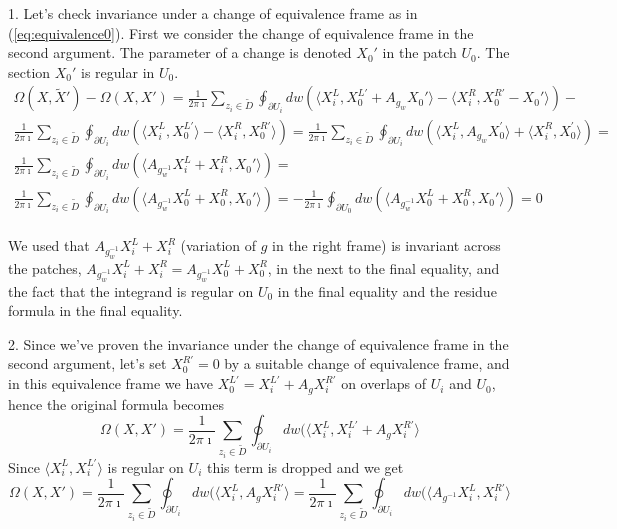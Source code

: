 \documentclass[11pt, oneside, reqno]{amsart}
\theoremstyle{definition} \newtheorem{definition}{Definition}[section]
\theoremstyle{definition} \newtheorem{remark}[definition]{Remark}
\theoremstyle{definition} \newtheorem{remarks}[definition]{Remarks}
\theoremstyle{definition} \newtheorem{question}[definition]{Question}
\theoremstyle{definition} \newtheorem*{note}{Note}
\theoremstyle{definition} \newtheorem{example}[definition]{Example}
\theoremstyle{definition} \newtheorem{examples}[definition]{Examples}
\begin{document}
1. Let's check invariance under a change of equivalence frame 
as in (\ref{eq:equivalence0}). First we consider the change
of equivalence frame in the second argument. 
The parameter of a change is denoted $X_0'$ in the patch $U_0$. The section $X_{0}'$ is regular in $U_{0}$. 
\begin{multline}
   \Omega(X, \tilde X') - \Omega( X,X')  = \frac{1}{2 \pi \imath} \sum_{z_i \in \tilde D} \oint_{\partial U_i}  dw (
   \langle  X^{L}_{i} ,  X^{L'}_{0} + A_{g_{w}} X_{0}' \rangle  - \langle X^{R}_{i} ,  X^{R'}_{0} - X_{0}'\rangle ) - \\
   \frac{1}{2 \pi \imath} \sum_{z_i \in \tilde D} \oint_{\partial U_i}  dw (
   \langle  X^{L}_{i} ,  X^{L'}_{0} \rangle  - \langle X^{R}_{i} ,  X^{R'}_{0} \rangle )   =
\frac{1}{2 \pi \imath} \sum_{z_i \in \tilde D} \oint_{\partial U_i}  dw (
\langle   X_{i}^{L},   A_{g_{w}}X^{'}_{0} \rangle  + \langle  X_{i}^{R},  X^{'}_{0} \rangle ) = \\
\frac{1}{2 \pi \imath} \sum_{z_i \in \tilde D} \oint_{\partial U_i}  dw (
\langle   A_{g_{w}^{-1}}  X_{i}^{L} + X_{i}^{R}, X_{0}' \rangle )  =\\
\frac{1}{2 \pi \imath} \sum_{z_i \in \tilde D} \oint_{\partial U_i}  dw (
\langle   A_{g_{w}^{-1}}  X_{0}^{L} + X_{0}^{R}, X_{0}' \rangle )  =
- \frac{1}{2 \pi \imath} \oint_{\partial U_0} dw (
\langle   A_{g_{w}^{-1}}  X_{0}^{L} + X_{0}^{R}, X_{0}' \rangle )  = 0 \\
\end{multline}

We used that $A_{g_{w}^{-1}}  X_{i}^{L} + X_{i}^{R}$ (variation of $g$ in the right frame)
is invariant across the patches, $A_{g_{w}^{-1}}  X_{i}^{L} + X_{i}^{R} = A_{g_{w}^{-1}}  X_{0}^{L} + X_{0}^{R}$,
in the next to the final equality, and the fact that the integrand is regular on $U_0$ in the final equality
and the residue formula in the final equality. 

2. Since we've proven the invariance under the change of equivalence frame in the second argument,
let's set $X_{0}^{R'} = 0$ by a suitable change of equivalence frame,
and in this equivalence frame we have $X_{0}^{L'} = X_i^{L'} + A_{g} X_i^{R'}$
on overlaps of $U_i$ and $U_0$,  hence
the original formula becomes 
\begin{equation}
\Omega(X, X') =   \frac{1}{2 \pi \imath} \sum_{z_i \in \tilde D} \oint_{\partial U_i}  dw (
\langle  X^{L}_{i}, X_i^{L'} + A_{g} X_i^{R'} \rangle 
\end{equation}
Since $\langle X_i^{L}, X_{i}^{L'} \rangle $ is regular on $U_i$ this term is dropped and we get
\begin{equation}
\label{eq:drop-right}
  \Omega(X, X') =   \frac{1}{2 \pi \imath} \sum_{z_i \in \tilde D} \oint_{\partial U_i}  dw (
\langle  X^{L}_{i},  A_{g} X_i^{R'} \rangle  =  \frac{1}{2 \pi \imath} \sum_{z_i \in \tilde D} \oint_{\partial U_i}  dw (
\langle  A_{g^{-1}} X^{L}_{i},   X_i^{R'} \rangle 
\end{equation}
\end{document}
